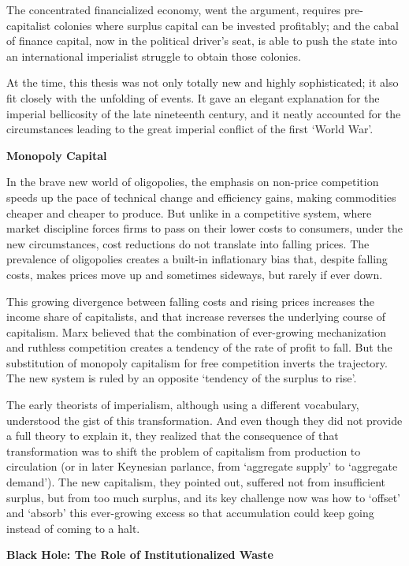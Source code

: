 \documentclass[
]{book}
\begin{document}
The concentrated financialized economy, went the argument, requires pre-capitalist colonies
where surplus capital can be invested profitably; and the cabal of finance capital, now in
the political driver's seat, is able to push the state into an international imperialist
struggle to obtain those colonies.

At the time, this thesis was not only totally new and highly sophisticated; it also
fit closely with the unfolding of events. It gave an elegant explanation for the imperial
bellicosity of the late nineteenth century, and it neatly accounted for the circumstances
leading to the great imperial conflict of the first `World War'.

\textbf{Monopoly Capital}

In the brave new world of oligopolies, the emphasis on non-price competition
speeds up the pace of technical change and efficiency gains, making commodities cheaper
and cheaper to produce. But unlike in a competitive system, where market discipline
forces firms to pass on their lower costs to consumers, under the new circumstances, cost
reductions do not translate into falling prices. The prevalence of oligopolies creates a
built-in inflationary bias that, despite falling costs, makes prices move up and sometimes
sideways, but rarely if ever down.

This growing divergence between falling costs and rising prices increases the
income share of capitalists, and that increase reverses the underlying course of capitalism.
Marx believed that the combination of ever-growing mechanization and ruthless
competition creates a tendency of the rate of profit to fall. But the substitution of
monopoly capitalism for free competition inverts the trajectory. The new system
is ruled by an opposite `tendency of the surplus to rise'.

The early theorists of imperialism, although using a different vocabulary,
understood the gist of this transformation. And even though they did not provide a full
theory to explain it, they realized that the consequence of that transformation was to shift
the problem of capitalism from production to circulation (or in later Keynesian parlance,
from `aggregate supply' to `aggregate demand'). The new capitalism, they pointed out,
suffered not from insufficient surplus, but from too much surplus, and its key challenge
now was how to `offset' and `absorb' this ever-growing excess so that accumulation could
keep going instead of coming to a halt.

\textbf{Black Hole: The Role of Institutionalized Waste}
\end{document}
